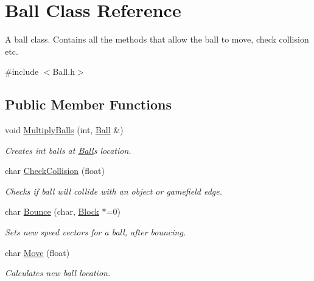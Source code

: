 \hypertarget{class_ball}{}\section{Ball Class Reference}
\label{class_ball}


A ball class. Contains all the methods that allow the ball to move, check collision etc.  




{\ttfamily \#include $<$Ball.\+h$>$}

\subsection*{Public Member Functions}
\begin{DoxyCompactItemize}
\item 
void \hyperlink{class_ball_ab7c303f4d158af0722e379eeeae72db6}{Multiply\+Balls} (int, \hyperlink{class_ball}{Ball} \&)
\begin{DoxyCompactList}\small\item\em Creates int balls at \hyperlink{class_ball}{Ball}\textquotesingle{}s location. \end{DoxyCompactList}\item 
char \hyperlink{class_ball_aebe80a6c3933f8fc029259a9b93b69c3}{Check\+Collision} (float)
\begin{DoxyCompactList}\small\item\em Checks if ball will collide with an object or gamefield edge. \end{DoxyCompactList}\item 
char \hyperlink{class_ball_a32baf305e64d31e71ba175aad54feb1b}{Bounce} (char, \hyperlink{class_block}{Block} $\ast$=0)
\begin{DoxyCompactList}\small\item\em Sets new speed vectors for a ball, after bouncing. \end{DoxyCompactList}\item 
char \hyperlink{class_ball_a6afd96091f6ddeaf12c77c7a3857f3f9}{Move} (float)
\begin{DoxyCompactList}\small\item\em Calculates new ball location. \end{DoxyCompactList}\end{DoxyCompactItemize}
